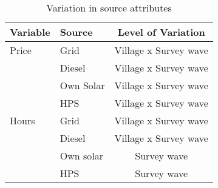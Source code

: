 \begin{table}[!ht]
	\centering
		\caption{Variation in source attributes}
\begin{tabular}{llc}
		\toprule
         Variable      & Source &   Level of Variation \\
		\midrule
		Price&   Grid & Village x Survey wave \\
		 &     Diesel & Village x Survey wave \\
		& Own Solar &  Village x Survey wave \\
		& HPS &   Village x Survey wave \\
		Hours & Grid & Village x Survey wave \\
		& Diesel & Village x Survey wave \\
		& Own solar & Survey wave \\
		& HPS & Survey wave \\
		\bottomrule
	\end{tabular}
\end{table}